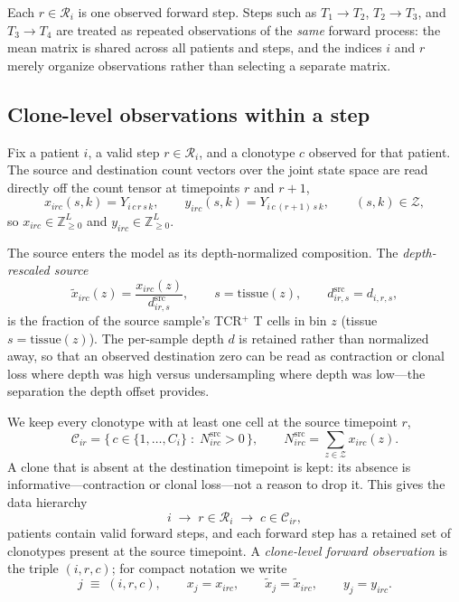 \documentclass[11pt]{article}
\newcommand{\Znn}{\mathbb{Z}_{\geq 0}}            %
\newcommand{\Zsp}{\mathcal{Z}}                    %
\newcommand{\Csp}{\mathcal{C}}                    %
\newcommand{\Rsp}{\mathcal{R}}                    %
\newcommand{\Nsrc}{N^{\mathrm{src}}}
\newcommand{\dsrc}{d^{\mathrm{src}}}
\theoremstyle{definition}
\begin{document}
Each $r \in \Rsp_i$ is one observed forward step. Steps such as
$T_1 \!\to\! T_2$, $T_2 \!\to\! T_3$, and $T_3 \!\to\! T_4$ are treated as
repeated observations of the \emph{same} forward process: the mean matrix is
shared across all patients and steps, and the indices $i$ and $r$ merely
organize observations rather than selecting a separate matrix.

\subsection{Clone-level observations within a step}

Fix a patient $i$, a valid step $r \in \Rsp_i$, and a clonotype $c$ observed for
that patient. The source and destination count vectors over the joint state
space are read directly off the count tensor at timepoints $r$ and $r+1$,
\[
  x_{irc}(s,k) = Y_{i\, c\, r\, s\, k},
  \qquad
  y_{irc}(s,k) = Y_{i\, c\, (r+1)\, s\, k},
  \qquad (s,k)\in\Zsp,
\]
so $x_{irc} \in \Znn^{L}$ and $y_{irc} \in \Znn^{L}$.

The source enters the model as its depth-normalized composition. The
\emph{depth-rescaled source}
\[
  \tilde{x}_{irc}(z) = \frac{x_{irc}(z)}{\dsrc_{ir,s}},
  \qquad s = \mathrm{tissue}(z),
  \qquad \dsrc_{ir,s} = d_{i,r,s},
\]
is the fraction of the source sample's TCR$^+$ T cells in bin $z$ (tissue
$s = \mathrm{tissue}(z)$). The per-sample depth $d$ is retained rather than
normalized away, so that an observed destination zero can be read as contraction
or clonal loss where depth was high versus undersampling where depth was
low---the separation the depth offset provides.

We keep every clonotype with at least one cell at the source timepoint $r$,
\[
  \Csp_{ir}
  =
  \bigl\{\,
    c \in \{1,\ldots,C_{i}\}
    \;:\;
    \Nsrc_{irc} > 0
  \,\bigr\},
  \qquad
  \Nsrc_{irc} = \sum_{z\in\Zsp} x_{irc}(z) .
\]
A clone that is absent at the destination timepoint is kept: its absence is
informative---contraction or clonal loss---not a reason to drop it. This gives
the data hierarchy
\[
  i
  \;\longrightarrow\;
  r \in \Rsp_i
  \;\longrightarrow\;
  c \in \Csp_{ir},
\]
patients contain valid forward steps, and each forward step has a retained set
of clonotypes present at the source timepoint. A \emph{clone-level forward
observation} is the triple $(i,r,c)$; for compact notation we write
\[
  j \;\equiv\; (i,r,c),
  \qquad
  x_j = x_{irc},
  \qquad
  \tilde{x}_j = \tilde{x}_{irc},
  \qquad
  y_j = y_{irc} .
\]
\end{document}
